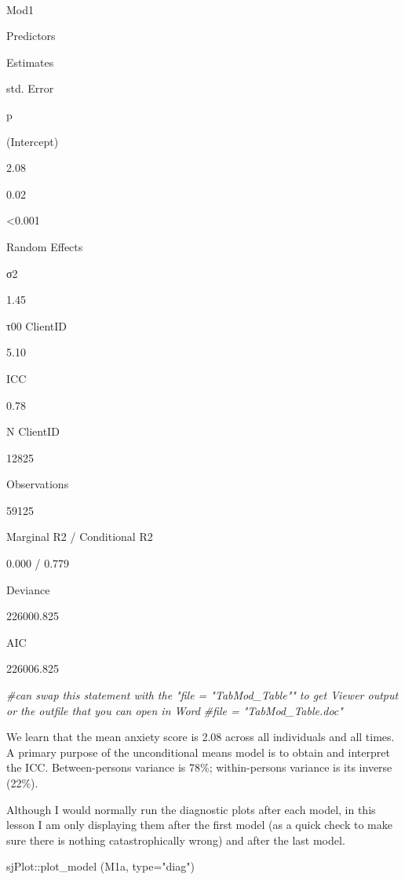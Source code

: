 \documentclass[
  english,
]{book}
\newenvironment{Shaded}{\begin{snugshade}}{\end{snugshade}}
\newcommand{\AttributeTok}[1]{\textcolor[rgb]{0.77,0.63,0.00}{#1}}
\newcommand{\CommentTok}[1]{\textcolor[rgb]{0.56,0.35,0.01}{\textit{#1}}}
\newcommand{\FunctionTok}[1]{\textcolor[rgb]{0.00,0.00,0.00}{#1}}
\newcommand{\NormalTok}[1]{#1}
\newcommand{\SpecialCharTok}[1]{\textcolor[rgb]{0.00,0.00,0.00}{#1}}
\newcommand{\StringTok}[1]{\textcolor[rgb]{0.31,0.60,0.02}{#1}}
\begin{document}
~

Mod1

Predictors

Estimates

std. Error

p

(Intercept)

2.08

0.02

\textless0.001

Random Effects

σ2

1.45

τ00 ClientID

5.10

ICC

0.78

N ClientID

12825

Observations

59125

Marginal R2 / Conditional R2

0.000 / 0.779

Deviance

226000.825

AIC

226006.825

\begin{Shaded}
\begin{Highlighting}[]
\CommentTok{\#can swap this statement with the "file = "TabMod\_Table"" to get Viewer output or the outfile that you can open in Word}
\CommentTok{\#file = "TabMod\_Table.doc"}
\end{Highlighting}
\end{Shaded}

We learn that the mean anxiety score is 2.08 across all individuals and all times. A primary purpose of the unconditional means model is to obtain and interpret the ICC. Between-persons variance is 78\%; within-persons variance is its inverse (22\%).

Although I would normally run the diagnostic plots after each model, in this lesson I am only displaying them after the first model (as a quick check to make sure there is nothing catastrophically wrong) and after the last model.

\begin{Shaded}
\begin{Highlighting}[]
\NormalTok{sjPlot}\SpecialCharTok{::}\FunctionTok{plot\_model}\NormalTok{ (M1a, }\AttributeTok{type=}\StringTok{"diag"}\NormalTok{)}
\end{Highlighting}
\end{Shaded}
\end{document}
